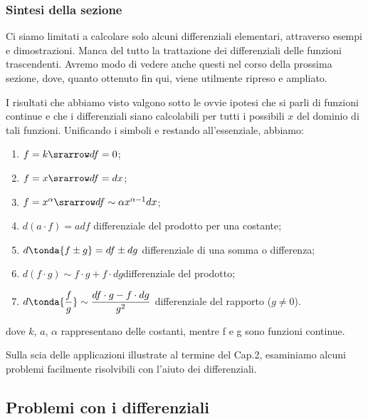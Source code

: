 \subsubsection{Sintesi della sezione}
\label{subsubsec:diff01_diffsint}
Ci siamo limitati a calcolare solo alcuni differenziali elementari, 
attraverso esempi e dimostrazioni. 
Manca del tutto la trattazione dei differenziali delle funzioni 
trascendenti. 
Avremo modo di vedere anche questi nel corso della prossima sezione, dove, 
quanto ottenuto fin qui, viene utilmente ripreso e ampliato.

I risultati che abbiamo visto valgono sotto le ovvie ipotesi
che si parli di funzioni continue e che i differenziali siano calcolabili
per tutti i possibili $x$ del dominio di tali funzioni. Unificando i 
simboli e restando all'essenziale, abbiamo:
\begin{enumerate} [noitemsep]
 \item $f=k \srarrow df=0$;
 \item $f=x \srarrow df=dx$;
 \item $f=x^\alpha \srarrow df\sim\alpha x^{\alpha-1}dx$;\newline
 \item $d(a\cdot f)=adf$ \tab differenziale del prodotto per una costante;
 \item $d\tonda{f\pm g}=df\pm dg$ \tab differenziale di una somma o 
differenza;
 \item $d(f\cdot g)\sim f\cdot g+f\cdot dg$\tab differenziale del prodotto;
 \item $d\tonda{\dfrac{f}{g}} \sim \dfrac{df\cdot g-f\cdot dg}{g^2}$\tab  
differenziale  del rapporto (\(g \ne 0\)).
\end{enumerate}
dove  $k$, $a$, $\alpha$ rappresentano delle costanti, mentre f e g sono 
funzioni continue. 


Sulla scia delle applicazioni illustrate al termine del Cap.2, esaminiamo 
alcuni problemi 
facilmente risolvibili con l'aiuto dei differenziali.

\subsection{Problemi con i differenziali}
\label{subsec:diff01__problemi}

